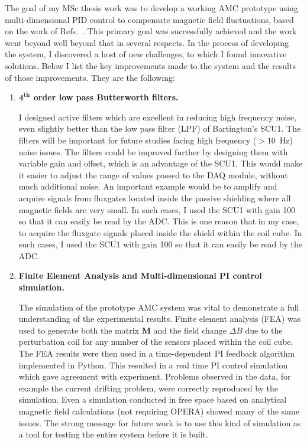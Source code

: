 The goal of my MSc thesis work was to develop a working AMC prototype using multi-dimensional PID control to compensate magnetic field 
fluctuations, based on the work of Refs.~\cite{bea,lins}. This primary goal was successfully achieved and the work went beyond well beyond that in several respects. In the process of developing the system, I discovered a host of new challenges, to which I found innovative solutions.  Below I
list the key improvements made to the system and the results of those
improvements.  They are the following:
\begin{enumerate}
\item {\bf $\mathbf{4^{th}}$ order low pass Butterworth filters.}  

I designed active filters which are excellent in reducing high frequency noise, even slightly better than the low pass filter (LPF) of Bartington's SCU1. The filters will be important for future studies facing high frequency ($>10$~Hz) noise issues. The filters could be improved further by designing them with variable gain and offset, which is an advantage of the SCU1. This would make it easier to adjust the range of values passed to the DAQ module, without much additional noise. An important example would be to amplify and acquire signals from fluxgates located inside the passive shielding where all magnetic fields are very small. In such cases, I used the SCU1 with gain 100 so that it can easily be read by the ADC.
This is one reason that in my case, to acquire the fluxgate signals placed inside the shield within the coil cube. In such cases, I used the SCU1 with gain 100 so that it can easily be read by the ADC.  



\item {\bf Finite Element Analysis and Multi-dimensional PI control simulation.}  

The simulation of the prototype AMC system was vital to demonstrate a full understanding of the experimental results. Finite element analysis (FEA) was used to generate both the matrix $\bm{M}$ and the field change $\Delta B$ due to the perturbation coil for any number of the sensors placed within the coil cube. The FEA results were then used in a time-dependent PI feedback algorithm implemented in Python. This resulted in a real time PI control simulation which gave agreement with experiment. Problems observed in the data, for example the current drifting problem, were correctly reproduced by the simulation. Even a simulation conducted in free space based on analytical magnetic field calculations (not requiring OPERA) showed many of the same issues. The strong message for future work is to use this kind of simulation as a tool for testing the entire system before it is built.


\end{enumerate}
